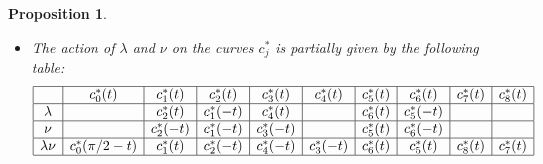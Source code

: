 \documentclass[reqno]{amsart}
\newcommand{\lm}        {\lambda}
\renewcommand{\:}{\colon}
\newtheorem{proposition}[theorem]{Proposition}
\theoremstyle{definition}
\begin{document}
\begin{proposition}
\begin{itemize}
  \item[(e)] The action of $\lm$ and $\nu$ on the curves $c_j^*$ is
   partially given by the following table:
   \[ \begin{array}{|c|c|c|c|c|c|c|c|c|c|}
    \hline
     &c_0^*(t)&c^*_1(t)&c^*_2(t)&c^*_3(t)&c^*_4(t)&c^*_5(t)&c^*_6(t)&c^*_7(t)&c^*_8(t)\\ \hline
     \lm & & c_2^*(t) & c_1^*(-t) & c_4^*(t) & &
           c_6^*(t) & c_5^*(-t) & &  \\ \hline
     \nu & & c_2^*(-t) & c_1^*(-t) & c_3^*(-t) & &
             c_5^*(t) & c_6^*(-t) & & \\ \hline
     \lm\nu & c_0^*(\pi/2-t) & c_1^*(t) & c_2^*(-t) &
              c_4^*(-t) & c_3^*(-t) & c_6^*(t) & c_5^*(t) &
              c_8^*(t) & c_7^*(t) \\ \hline
   \end{array} \]
 \end{itemize}
\end{proposition}
\end{document}
